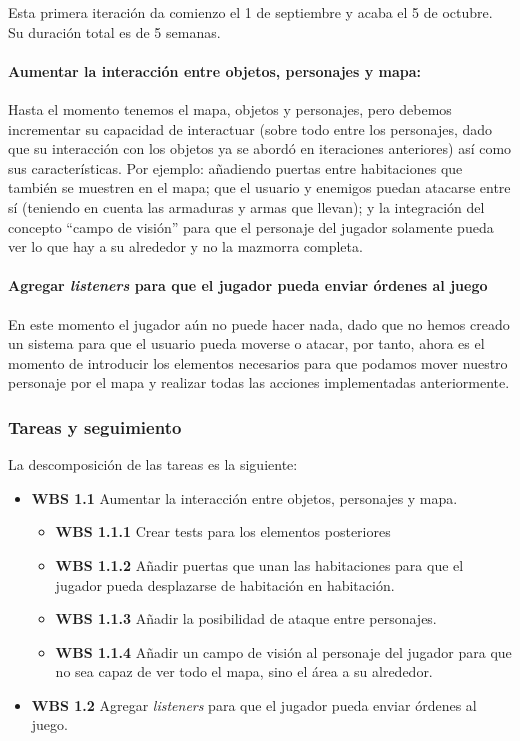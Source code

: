Esta primera iteración da comienzo el 1 de septiembre y acaba el 5 de octubre. Su duración total es de 5 semanas.

\paragraph{Aumentar la interacción entre objetos, personajes y mapa:} Hasta el momento tenemos el mapa, objetos y personajes, pero debemos incrementar su capacidad de interactuar (sobre todo entre los personajes, dado que su interacción con los objetos ya se abordó en iteraciones anteriores) así como sus características. Por ejemplo: añadiendo puertas entre habitaciones que también se muestren en el mapa; que el usuario y enemigos puedan atacarse entre sí (teniendo en cuenta las armaduras y armas que llevan); y la integración del concepto ``campo de visión'' para que el personaje del jugador solamente pueda ver lo que hay a su alrededor y no la mazmorra completa.

\paragraph{Agregar \textit{listeners} para que el jugador pueda enviar órdenes al juego} En este momento el jugador aún no puede hacer nada, dado que no hemos creado un sistema para que el usuario pueda moverse o atacar, por tanto, ahora es el momento de introducir los elementos necesarios para que podamos mover nuestro personaje por el mapa y realizar todas las acciones implementadas anteriormente.

\subsubsection{Tareas y seguimiento}

La descomposición de las tareas es la siguiente:

\begin{itemize}
  \item \textbf{WBS 1.1} Aumentar la interacción entre objetos, personajes y mapa.
    \begin{itemize}
      \item \textbf{WBS 1.1.1} Crear tests para los elementos posteriores
      \item \textbf{WBS 1.1.2} Añadir puertas que unan las habitaciones para que el jugador pueda desplazarse de habitación en habitación.
      \item \textbf{WBS 1.1.3} Añadir la posibilidad de ataque entre personajes.
      \item \textbf{WBS 1.1.4} Añadir un campo de visión al personaje del jugador para que no sea capaz de ver todo el mapa, sino el área a su alrededor.
    \end{itemize}
  \item \textbf{WBS 1.2} Agregar \textit{listeners} para que el jugador pueda enviar órdenes al juego.
\end{itemize}

